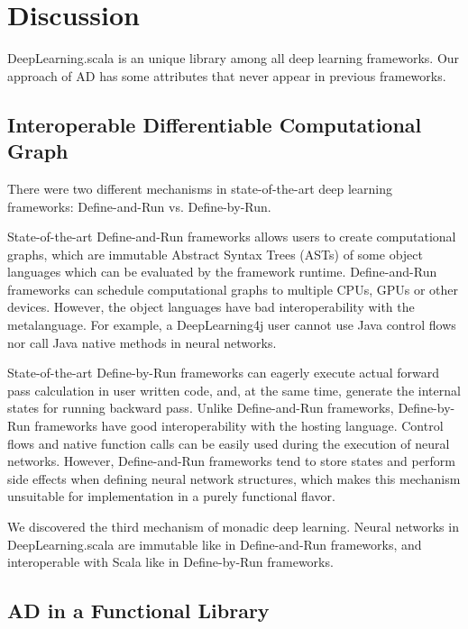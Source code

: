 \section{Discussion}

DeepLearning.scala is an unique library among all deep learning frameworks. Our approach of AD has some attributes that never appear in previous frameworks.

\subsection{Interoperable Differentiable Computational Graph}

There were two different mechanisms in state-of-the-art deep learning frameworks:
Define-and-Run vs. Define-by-Run.

State-of-the-art Define-and-Run frameworks\cite{collobert2008torch,bergstra2010theano,jia2014caffe,chen2015mxnet,abadi2016tensorflow,intel2016bigdl,skymind2017deeplearning4j} allows users to create \glspl{computational graph}, which are immutable Abstract Syntax Trees (ASTs) of some object languages which can be evaluated by the framework runtime. Define-and-Run frameworks can schedule \glspl{computational graph} to multiple CPUs, GPUs or other devices. However, the object languages have bad interoperability with the metalanguage. For example, a DeepLearning4j user cannot use Java control flows nor call Java native methods in neural networks.

State-of-the-art Define-by-Run frameworks\cite{tokui2015chainer,neubig2017dynet,google2017eager,paszke2017pytorch} can eagerly execute actual forward pass calculation in user written code, and, at the same time, generate the internal states for running backward pass. Unlike Define-and-Run frameworks, Define-by-Run frameworks have good interoperability with the hosting language. Control flows and native function calls can be easily used during the execution of neural networks. However, Define-and-Run frameworks tend to store states and perform side effects when defining neural network structures, which makes this mechanism unsuitable for implementation in a purely functional flavor.

We discovered the third mechanism of monadic deep learning. Neural networks in DeepLearning.scala are immutable like in Define-and-Run frameworks, and interoperable with Scala like in Define-by-Run frameworks.

\subsection{AD in a Functional Library}

